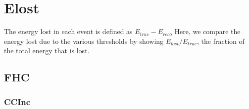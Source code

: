 \section{Elost}

The energy lost in each event is defined as $E_{true} - E_{reco}$  Here, we compare the energy lost due to the various thresholds by showing $E_{lost}/E_{true}$, the fraction of the total energy that is lost.

\subsection{FHC}

\subsubsection{CCInc}

